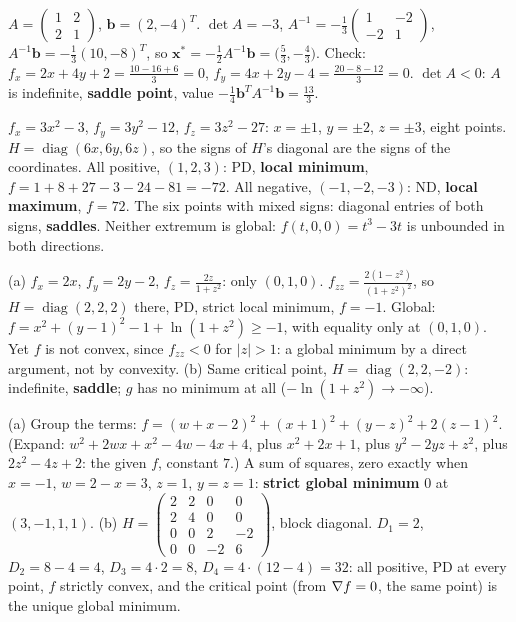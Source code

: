 \begin{solutions}
    \item $A = \begin{pmatrix} 1 & 2 \\ 2 & 1 \end{pmatrix}$, $\mathbf{b} = (2, -4)^T$. $\det A = -3$, $A^{-1} = -\tfrac13 \begin{pmatrix} 1 & -2 \\ -2 & 1 \end{pmatrix}$, $A^{-1} \mathbf{b} = -\tfrac13 (10, -8)^T$, so $\mathbf{x}^* = -\tfrac12 A^{-1} \mathbf{b} = \bigl(\tfrac53, -\tfrac43\bigr)$. Check: $f_x = 2 x + 4 y + 2 = \tfrac{10 - 16 + 6}{3} = 0$, $f_y = 4 x + 2 y - 4 = \tfrac{20 - 8 - 12}{3} = 0$. $\det A < 0$: $A$ is indefinite, \textbf{saddle point}, value $-\tfrac14 \mathbf{b}^T A^{-1} \mathbf{b} = \tfrac{13}{3}$.
    \item $f_x = 3 x^2 - 3$, $f_y = 3 y^2 - 12$, $f_z = 3 z^2 - 27$: $x = \pm 1$, $y = \pm 2$, $z = \pm 3$, eight points. $H = \operatorname{diag}(6 x, 6 y, 6 z)$, so the signs of $H$'s diagonal are the signs of the coordinates. All positive, $(1, 2, 3)$: PD, \textbf{local minimum}, $f = 1 + 8 + 27 - 3 - 24 - 81 = -72$. All negative, $(-1, -2, -3)$: ND, \textbf{local maximum}, $f = 72$. The six points with mixed signs: diagonal entries of both signs, \textbf{saddles}. Neither extremum is global: $f(t, 0, 0) = t^3 - 3 t$ is unbounded in both directions.
    \item (a) $f_x = 2 x$, $f_y = 2 y - 2$, $f_z = \tfrac{2 z}{1 + z^2}$: only $(0, 1, 0)$. $f_{zz} = \tfrac{2 (1 - z^2)}{(1 + z^2)^2}$, so $H = \operatorname{diag}(2, 2, 2)$ there, PD, strict local minimum, $f = -1$. Global: $f = x^2 + (y - 1)^2 - 1 + \ln(1 + z^2) \ge -1$, with equality only at $(0, 1, 0)$. Yet $f$ is not convex, since $f_{zz} < 0$ for $|z| > 1$: a global minimum by a direct argument, not by convexity. (b) Same critical point, $H = \operatorname{diag}(2, 2, -2)$: indefinite, \textbf{saddle}; $g$ has no minimum at all ($-\ln(1 + z^2) \to -\infty$).
    \item (a) Group the terms: $f = (w + x - 2)^2 + (x + 1)^2 + (y - z)^2 + 2 (z - 1)^2$. (Expand: $w^2 + 2 w x + x^2 - 4 w - 4 x + 4$, plus $x^2 + 2 x + 1$, plus $y^2 - 2 y z + z^2$, plus $2 z^2 - 4 z + 2$: the given $f$, constant $7$.) A sum of squares, zero exactly when $x = -1$, $w = 2 - x = 3$, $z = 1$, $y = z = 1$: \textbf{strict global minimum} $0$ at $(3, -1, 1, 1)$. (b) $H = \begin{pmatrix} 2 & 2 & 0 & 0 \\ 2 & 4 & 0 & 0 \\ 0 & 0 & 2 & -2 \\ 0 & 0 & -2 & 6 \end{pmatrix}$, block diagonal. $D_1 = 2$, $D_2 = 8 - 4 = 4$, $D_3 = 4 \cdot 2 = 8$, $D_4 = 4 \cdot (12 - 4) = 32$: all positive, PD at every point, $f$ strictly convex, and the critical point (from $\nabla f = 0$, the same point) is the unique global minimum.

\end{solutions}
